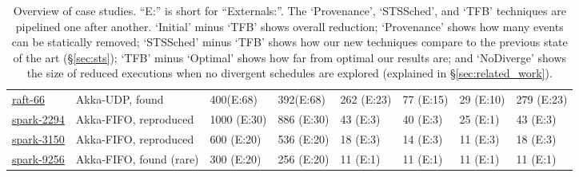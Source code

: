 \begin{table*}
\begin{adjustwidth}{-1.2cm}{}
{\begin{tabular}{|l|l|l|l|l|l||l||l|}
\href{https://docs.google.com/document/d/1lCAR_IE_U27CA-VTlPCi4Kyxf4h6Ykx-0zbkHe0Gfbg}{raft-66}
& Akka-UDP, found
& 400\hfill (E:68) & 392\hfill (E:68) & 262 \hfill (E:23) & 77 \hfill (E:15) &
29 \hfill (E:10) & 279 \hfill (E:23) \\

\href{https://docs.google.com/document/d/1JQiaLlm6XwLCWKOBOFkaMzg8Gd7NT5gDH3_8OV-oekY}{spark-2294}
& Akka-FIFO, reproduced
& 1000 \hfill (E:30) & 886 \hfill (E:30) & 43 \hfill (E:3) & 40 \hfill (E:3) &
25 \hfill (E:1) & 43 \hfill (E:3) \\


\href{https://docs.google.com/document/d/1mWbxS2-B0v4fbY_FIASs6HCmAXFh6K89DMYX-XEmeL8}{spark-3150}
& Akka-FIFO, reproduced
& 600 \hfill (E:20) & 536 \hfill (E:20) & 18 \hfill (E:3) & 14 \hfill (E:3) &
11 \hfill (E:3) & 18 \hfill (E:3) \\

\href{https://docs.google.com/document/d/1rPseAbo3FELT8Fj2lrRUMkrDmjLPYI26Jgr8goAMLzU}{spark-9256}
& Akka-FIFO, found (rare)
& 300 \hfill (E:20) & 256 \hfill (E:20) & 11 \hfill (E:1) & 11 \hfill (E:1) &
11 \hfill (E:1) & 11 \hfill (E:1) \\

\hline
\end{tabular}
\caption{Overview of case studies. ``E:'' is short for ``Externals:''. The
`Provenance', `STSSched', and `TFB' techniques are pipelined one after another.
`Initial' minus `TFB' shows overall reduction; `Provenance' shows how many events can be statically
removed; `STSSched' minus `TFB' shows how our new techniques
compare to the previous state of the art (\S\ref{sec:sts});
 `TFB' minus `Optimal' shows how far from optimal our results are; and
`NoDiverge' shows the size of reduced executions when no divergent schedules are explored (explained
in \S\ref{sec:related_work}).}
\label{dtab:case_studies}
}
\end{adjustwidth}
\end{table*}

